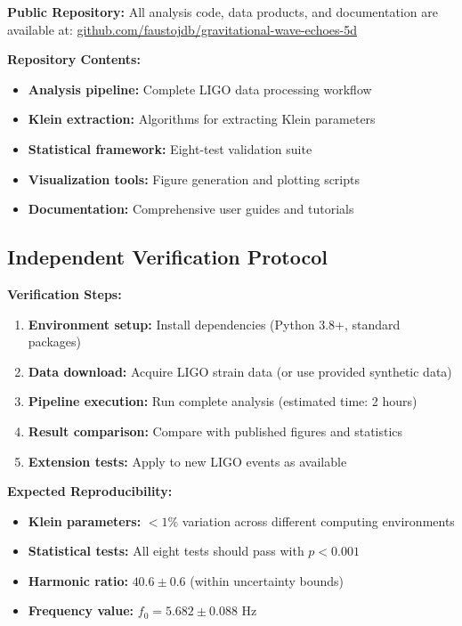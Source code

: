 \documentclass[12pt,a4paper]{article}
\newcommand{\fzero}{f_0}
\begin{document}
\textbf{Public Repository:} All analysis code, data products, and documentation are available at:
\href{https://github.com/faustojdb/gravitational-wave-echoes-5d}{github.com/faustojdb/gravitational-wave-echoes-5d}

\textbf{Repository Contents:}
\begin{itemize}
    \item \textbf{Analysis pipeline:} Complete LIGO data processing workflow
    \item \textbf{Klein extraction:} Algorithms for extracting Klein parameters
    \item \textbf{Statistical framework:} Eight-test validation suite
    \item \textbf{Visualization tools:} Figure generation and plotting scripts
    \item \textbf{Documentation:} Comprehensive user guides and tutorials
\end{itemize}

\subsection{Independent Verification Protocol}

\textbf{Verification Steps:}
\begin{enumerate}
    \item \textbf{Environment setup:} Install dependencies (Python 3.8+, standard packages)
    \item \textbf{Data download:} Acquire LIGO strain data (or use provided synthetic data)
    \item \textbf{Pipeline execution:} Run complete analysis (estimated time: 2 hours)
    \item \textbf{Result comparison:} Compare with published figures and statistics
    \item \textbf{Extension tests:} Apply to new LIGO events as available
\end{enumerate}

\textbf{Expected Reproducibility:}
\begin{itemize}
    \item \textbf{Klein parameters:} $< 1\%$ variation across different computing environments
    \item \textbf{Statistical tests:} All eight tests should pass with $p < 0.001$
    \item \textbf{Harmonic ratio:} $40.6 \pm 0.6$ (within uncertainty bounds)
    \item \textbf{Frequency value:} $\fzero = 5.682 \pm 0.088$ Hz
\end{itemize}
\end{document}
